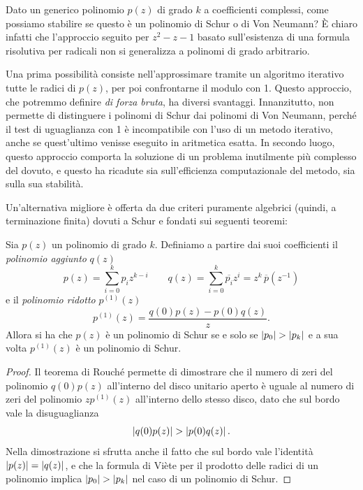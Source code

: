 \noindent Dato un generico polinomio $p(z)$ di grado $k$ a coefficienti complessi,
come possiamo stabilire se questo è un polinomio di Schur o di Von Neumann?
È chiaro infatti che l'approccio seguito per $z^2-z-1$ basato sull'esistenza
di una formula risolutiva per radicali non si generalizza a polinomi di grado arbitrario.

Una prima possibilità consiste nell'approssimare tramite un algoritmo
iterativo tutte le radici di $p(z)$, per poi confrontarne il modulo con 1.
Questo approccio, che potremmo definire \emph{di forza bruta},
ha diversi svantaggi. Innanzitutto, non permette di distinguere i polinomi
di Schur dai polinomi di Von Neumann, perché il test di uguaglianza
con 1 è incompatibile con l'uso di un metodo iterativo, anche se
quest'ultimo venisse eseguito in aritmetica esatta.
In secondo luogo, questo approccio comporta la soluzione di un problema
inutilmente più complesso del dovuto, e questo ha ricadute sia sull'efficienza
computazionale del metodo, sia sulla sua stabilità.

Un'alternativa migliore è offerta da due criteri puramente algebrici
(quindi, a terminazione finita) dovuti a Schur e fondati sui seguenti teoremi:

\begin{teor}  \label{teor:schur1}
Sia $p(z)$ un polinomio di grado $k$. Definiamo a partire dai
suoi coefficienti il \emph{polinomio aggiunto} $q(z)$
\[
p(z) = \sum_{i=0}^k p_i z^{k-i}
\qquad
q(z) = \sum_{i=0}^k \overline{p_i} z^i = z^k \, \overline{p}(z^{-1})
\]
e il \emph{polinomio ridotto} $p^{(1)}(z)$
\[
p^{(1)}(z) = \frac{q(0)p(z)-p(0)q(z)}{z}.
\]
Allora si ha che $p(z)$ è un polinomio di Schur se e solo se
$\left\lvert p_0\right\rvert > \left\lvert p_k\right\rvert$ e a sua volta $p^{(1)}(z)$ è un polinomio di Schur.
\end{teor}

\begin{proof}
Il teorema di Rouché permette di dimostrare che il numero di zeri
del polinomio $q(0)p(z)$ all'interno del disco unitario aperto
è uguale al numero di zeri del polinomio $zp^{(1)}(z)$
all'interno dello stesso disco, dato che sul bordo vale la disuguaglianza
\[
\left\lvert q(0)p(z)\right\rvert > \left\lvert p(0)q(z)\right\rvert.
\]
Nella dimostrazione si sfrutta anche il fatto che sul bordo
vale l'identità $\left\lvert p(z)\right\rvert = \left\lvert q(z)\right\rvert$, e che la formula di Viète
per il prodotto delle radici di un polinomio implica $\left\lvert p_0\right\rvert > \left\lvert p_k\right\rvert$
nel caso di un polinomio di Schur.
\end{proof}

